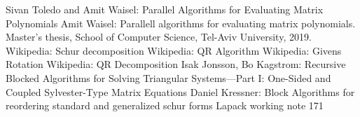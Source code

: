 \documentclass[12pt,a4paper]{article}
\begin{document}


\begin{thebibliography}{9}
Sivan Toledo and Amit Waisel: Parallel Algorithms for Evaluating Matrix Polynomials
Amit Waisel: Parallell algorithms for evaluating matrix polynomials. Master’s
thesis, School of Computer Science, Tel-Aviv University, 2019.
Wikipedia: Schur decomposition
Wikipedia: QR Algorithm
Wikipedia: Givens Rotation
Wikipedia: QR Decomposition
Isak Jonsson, Bo Kagstrom: Recursive Blocked Algorithms for Solving Triangular Systems—Part I: One-Sided and Coupled Sylvester-Type Matrix Equations
Daniel Kressner: Block Algorithms for reordering standard and generalized schur forms Lapack working note 171

\end{thebibliography}
\end{document}
